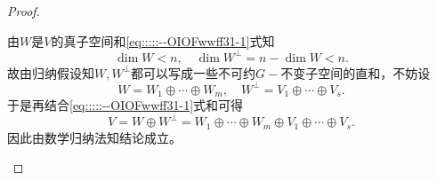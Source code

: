 \documentclass[../../main.tex]{subfiles}%
\begin{document}
\begin{proof}
\begin{enumerate}[(1)]
由$W$是$V$的真子空间和\eqref{eq:::::--OIOFwwff31-1}式知
$$\dim W<n,\quad \dim W^\perp=n-\dim W<n.$$
故由归纳假设知$W,W^\perp$都可以写成一些不可约$G-$不变子空间的直和，不妨设
$$W=W_1\oplus \cdots \oplus W_m,\quad W^\perp=V_1\oplus \cdots \oplus V_s.$$
于是再结合\eqref{eq:::::--OIOFwwff31-1}式和可得
$$V=W\oplus W^\perp=W_1\oplus \cdots \oplus W_m\oplus V_1\oplus \cdots \oplus V_s.$$
因此由数学归纳法知结论成立。
\end{enumerate}
\end{proof}
\end{document}
